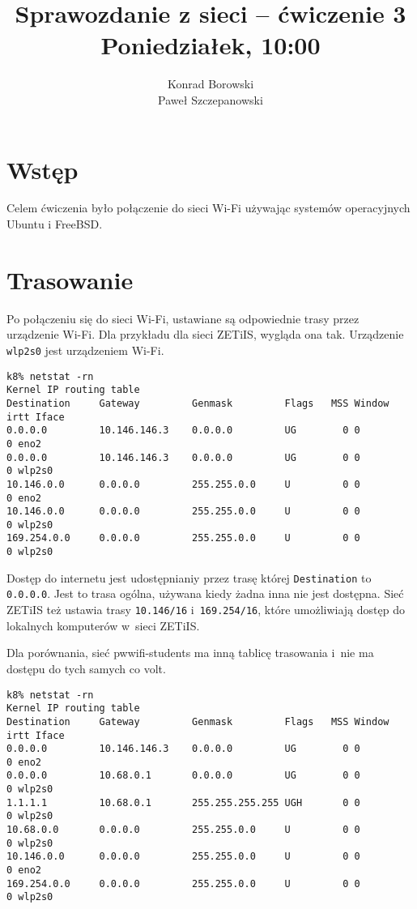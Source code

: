 \documentclass[a4paper,11pt]{article}
\title{Sprawozdanie z sieci -- ćwiczenie 3\\Poniedziałek, 10:00}
\author{Konrad Borowski\\Paweł Szczepanowski}
\begin{document}
\thispagestyle{empty}                   %

\maketitle

\section{Wstęp}

Celem ćwiczenia było połączenie do sieci Wi-Fi używając systemów
operacyjnych Ubuntu i FreeBSD.

\section{Trasowanie}

Po połączeniu się do sieci Wi-Fi, ustawiane są odpowiednie trasy
przez urządzenie Wi-Fi. Dla przykładu dla sieci ZETiIS, wygląda
ona tak. Urządzenie \verb|wlp2s0| jest urządzeniem Wi-Fi.

\begin{verbatim}
k8% netstat -rn
Kernel IP routing table
Destination     Gateway         Genmask         Flags   MSS Window  irtt Iface
0.0.0.0         10.146.146.3    0.0.0.0         UG        0 0          0 eno2
0.0.0.0         10.146.146.3    0.0.0.0         UG        0 0          0 wlp2s0
10.146.0.0      0.0.0.0         255.255.0.0     U         0 0          0 eno2
10.146.0.0      0.0.0.0         255.255.0.0     U         0 0          0 wlp2s0
169.254.0.0     0.0.0.0         255.255.0.0     U         0 0          0 wlp2s0
\end{verbatim}

Dostęp do internetu jest udostępnianiy przez trasę której
\verb|Destination| to \verb|0.0.0.0|. Jest to trasa ogólna, używana
kiedy żadna inna nie jest dostępna. Sieć ZETiIS też ustawia trasy
\verb|10.146/16| i~\verb|169.254/16|, które umożliwiają dostęp do
lokalnych komputerów w~sieci ZETiIS.

Dla porównania, sieć pwwifi-students ma inną tablicę trasowania i~nie
ma dostępu do tych samych co volt.

\begin{verbatim}
k8% netstat -rn
Kernel IP routing table
Destination     Gateway         Genmask         Flags   MSS Window  irtt Iface
0.0.0.0         10.146.146.3    0.0.0.0         UG        0 0          0 eno2
0.0.0.0         10.68.0.1       0.0.0.0         UG        0 0          0 wlp2s0
1.1.1.1         10.68.0.1       255.255.255.255 UGH       0 0          0 wlp2s0
10.68.0.0       0.0.0.0         255.255.0.0     U         0 0          0 wlp2s0
10.146.0.0      0.0.0.0         255.255.0.0     U         0 0          0 eno2
169.254.0.0     0.0.0.0         255.255.0.0     U         0 0          0 wlp2s0
\end{verbatim}
\end{document}
